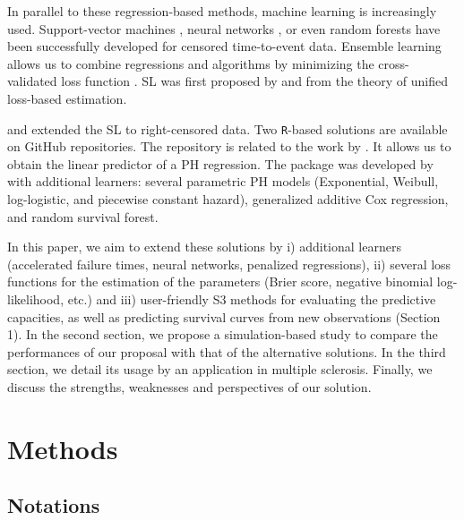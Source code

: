 In parallel to these regression-based methods, machine learning is increasingly used. Support-vector machines \citep{shivaswamySupportVectorApproach2007}, neural networks \citep{faraggiNeuralNetworkModel1995}, or even random forests \citep{ishwaranRandomSurvivalForests2008a} have been successfully developed for censored time-to-event data. Ensemble learning allows us to combine regressions and algorithms by minimizing the cross-validated loss function \citep{breimanStackedRegressions1996}. SL was first proposed by \citet{vanderlaanSuperLearner2007} and \citet{vanderlaandudoit2003} from the theory of unified loss-based estimation.

\citet{polleyChapterSuperLearning2011} and \citet{polleyChapter16Super2011} extended the SL to right-censored data. Two \texttt{R}-based solutions are available on GitHub repositories. The  repository is related to the work by \citet{golmakaniSuperLearnerSurvival2020a}. It allows us to obtain the linear predictor of a PH regression. The  package was developed by \citet{westlingPkgsurvSuperLearnerSuperLearning2021} with additional learners: several parametric PH models (Exponential, Weibull, log-logistic, and piecewise constant hazard), generalized additive Cox regression, and random survival forest.

In this paper, we aim to extend these solutions by i) additional learners (accelerated failure times, neural networks, penalized regressions), ii) several loss functions for the estimation of the parameters (Brier score, negative binomial log-likelihood, etc.) and iii) user-friendly S3 methods for evaluating the predictive capacities, as well as predicting survival curves from new observations (Section 1). In the second section, we propose a simulation-based study to compare the performances of our proposal with that of the alternative solutions. In the third section, we detail its usage by an application in multiple sclerosis. Finally, we discuss the strengths, weaknesses and perspectives of our solution.

\hypertarget{methods}{%
\section{Methods}\label{methods}}

\hypertarget{notations}{%
\subsection{Notations}\label{notations}}

